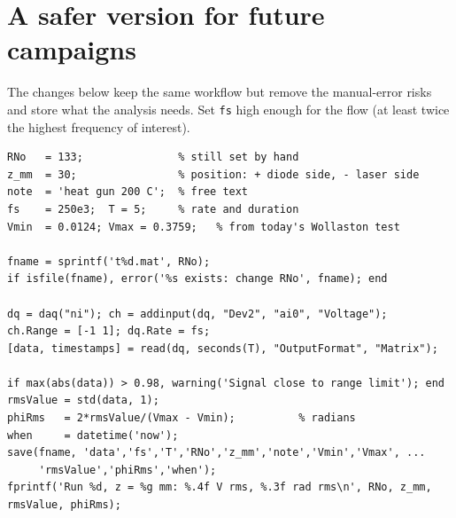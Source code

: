 \documentclass[11pt,a4paper]{article}
\newcommand{\code}[1]{\texttt{#1}}
\begin{document}
\section{A safer version for future campaigns}
The changes below keep the same workflow but remove the manual-error risks and store what the
analysis needs. Set \code{fs} high enough for the flow (at least twice the highest frequency of
interest).
\begin{lstlisting}[style=m,numbers=none]
RNo   = 133;               % still set by hand
z_mm  = 30;                % position: + diode side, - laser side
note  = 'heat gun 200 C';  % free text
fs    = 250e3;  T = 5;     % rate and duration
Vmin  = 0.0124; Vmax = 0.3759;   % from today's Wollaston test

fname = sprintf('t%d.mat', RNo);
if isfile(fname), error('%s exists: change RNo', fname); end

dq = daq("ni"); ch = addinput(dq, "Dev2", "ai0", "Voltage");
ch.Range = [-1 1]; dq.Rate = fs;
[data, timestamps] = read(dq, seconds(T), "OutputFormat", "Matrix");

if max(abs(data)) > 0.98, warning('Signal close to range limit'); end
rmsValue = std(data, 1);
phiRms   = 2*rmsValue/(Vmax - Vmin);          % radians
when     = datetime('now');
save(fname, 'data','fs','T','RNo','z_mm','note','Vmin','Vmax', ...
     'rmsValue','phiRms','when');
fprintf('Run %d, z = %g mm: %.4f V rms, %.3f rad rms\n', RNo, z_mm, rmsValue, phiRms);
\end{lstlisting}
\end{document}
